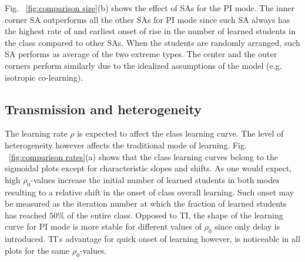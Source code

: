 \documentclass[twocolumn,secnumarabic,amssymb, nobibnotes, aps, prd]{revtex4-2}
\begin{document}
        Fig. ~\ref{fig:comparison size}(b) shows the effect of SAs for the PI mode.
        The inner corner SA outperforms all the other SAs for PI mode since such SA always has the highest rate of and earliest onset of rise in the number of learned students in the class compared to other SAs.
        When the students are randomly arranged, such SA performs as average of the two extreme types.
        The center and the outer corners perform similarly due to the idealized assumptions of the model (e.g. isotropic co-learning).

    \subsection{Transmission and heterogeneity}

        The learning rate $\rho$ is expected to affect the class learning curve.
        The level of heterogeneity however affects the traditional mode of learning.
        Fig. ~\ref{fig:comparison rates}(a) shows that the class learning curves belong to the sigmoidal plots except for characteristic slopes and shifts.
        As one would expect, high $\rho_0$-values increase the initial number of learned students in both modes resulting to a relative shift in the onset of class overall learning.
        Such onset may be measured as the iteration number at which the fraction of learned students has reached $50\%$ of the entire class.
        Opposed to TI, the shape of the learning curve for PI mode is more stable for different values of $\rho_0$ since only delay is introduced.
        TI's advantage for quick onset of learning however, is noticeable in all plots for the same $\rho_0$-values.
\end{document}
